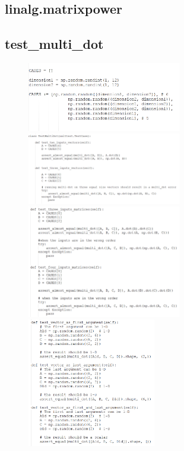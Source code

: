 \documentclass[a4paper,11pt]{article}
\begin{document}
\subsection{linalg.matrixpower}


\subsection{test\_multi\_dot}	
\begin{figure}[H]
	\centering
	\includegraphics[width=0.6\textwidth]{snippets/multi_dot/1CASES.PNG}
	\includegraphics[width=0.6\textwidth]{snippets/multi_dot/2.PNG}
	\includegraphics[width=0.6\textwidth]{snippets/multi_dot/3.PNG}
	\includegraphics[width=0.5\textwidth]{snippets/multi_dot/4.PNG}

\end{figure}
\end{document}
